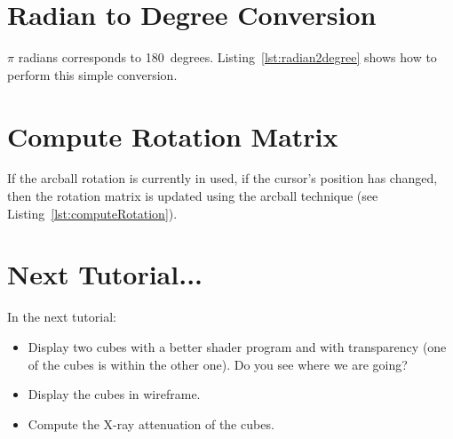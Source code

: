 \documentclass[11pt,oneside,a4paper,final]{article}
\begin{document}
\begin{center}

\end{center}


\section{Radian to Degree Conversion}
\label{radian2degree}

$\pi$ radians corresponds to 180~degrees. 
Listing~\ref{lst:radian2degree} shows how to perform this simple conversion. 

\begin{center}

\end{center}


\section{Compute Rotation Matrix}
\label{computeRotation}

If the arcball rotation is currently in used, if the cursor's position has changed, then the rotation matrix is updated using the arcball technique
(see Listing~\ref{lst:computeRotation}). 

\begin{center}

\end{center}

	
\section{Next Tutorial...}
\label{sec:Next Tutorial}

In the next tutorial:
\begin{itemize}
	\item Display two cubes with a better shader program and with transparency (one of the cubes is within the other one). 
	Do you see where we are going?
	
	\item Display the cubes in wireframe.
	
	\item Compute the X-ray attenuation of the cubes.
\end{itemize}
\end{document}
